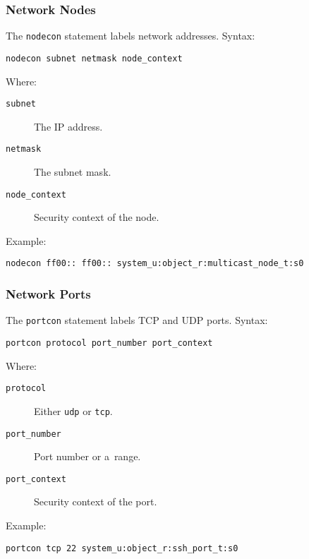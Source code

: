 \subsubsection{Network Nodes}
The \texttt{nodecon} statement labels network addresses. Syntax:
\begin{lstlisting}[language=te]
nodecon subnet netmask node_context
\end{lstlisting}
Where:
\begin{description}
    \item [\texttt{subnet}] The IP address.
    \item [\texttt{netmask}] The subnet mask.
    \item [\texttt{node\_context}] Security context of the node.
\end{description}
Example:
\begin{lstlisting}[language=te]
nodecon ff00:: ff00:: system_u:object_r:multicast_node_t:s0
\end{lstlisting}

\subsubsection{Network Ports}
The \texttt{portcon} statement labels TCP and UDP ports. Syntax:
\begin{lstlisting}[language=te]
portcon protocol port_number port_context
\end{lstlisting}
Where:
\begin{description}
    \item [\texttt{protocol}] Either \texttt{udp} or \texttt{tcp}.
    \item [\texttt{port\_number}] Port number or a~range.
    \item [\texttt{port\_context}] Security context of the port.
\end{description}
Example:
\begin{lstlisting}[language=te]
portcon tcp 22 system_u:object_r:ssh_port_t:s0
\end{lstlisting}


